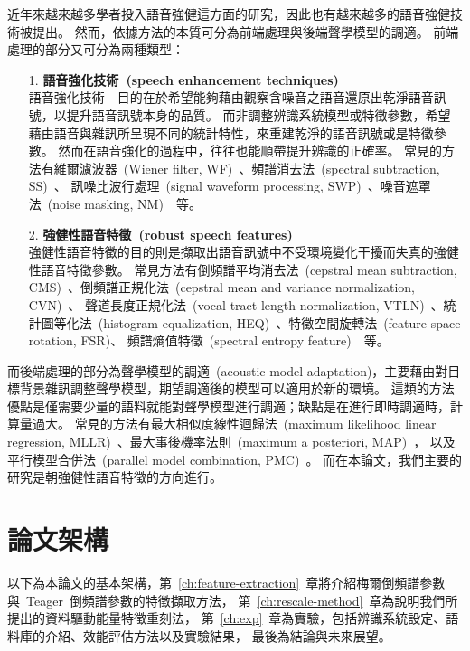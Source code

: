 近年來越來越多學者投入語音強健這方面的研究，因此也有越來越多的語音強健技術被提出。
然而，依據方法的本質可分為前端處理與後端聲學模型的調適。
前端處理的部分又可分為兩種類型：
\begin{itemize}
\item[1.]{\bf 語音強化技術~(speech enhancement techniques)} \\
	語音強化技術~\cite{David2007,Crookes2011}~目的在於希望能夠藉由觀察含噪音之語音還原出乾淨語音訊號，以提升語音訊號本身的品質。
	而非調整辨識系統模型或特徵參數，希望藉由語音與雜訊所呈現不同的統計特性，來重建乾淨的語音訊號或是特徵參數。
	然而在語音強化的過程中，往往也能順帶提升辨識的正確率。
	常見的方法有維爾濾波器~(Wiener filter, WF)~\cite{Ngo2012}、頻譜消去法~(spectral subtraction, SS)~\cite{Randy2004}、
	訊噪比波行處理~(signal waveform processing, SWP)~\cite{Macho2001}、噪音遮罩法~(noise masking, NM)~\cite{Christophe2007}~等。
\item[2.]{\bf 強健性語音特徵~(robust speech features)} \\
	強健性語音特徵的目的則是擷取出語音訊號中不受環境變化干擾而失真的強健性語音特徵參數。
	常見方法有倒頻譜平均消去法~(cepstral mean subtraction, CMS)~\cite{Veisi2011}、倒頻譜正規化法~(cepstral mean and variance normalization, CVN)~\cite{Viikki1988}、
	聲道長度正規化法~(vocal tract length normalization, VTLN)~\cite{Tom1998}、統計圖等化法~(histogram equalization, HEQ)~\cite{Yasunari2003}、特徵空間旋轉法~(feature space rotation, FSR)、
	頻譜熵值特徵~(spectral entropy feature)~\cite{Misra2005}~等。
\end{itemize}
而後端處理的部分為聲學模型的調適~(acoustic model adaptation)，主要藉由對目標背景雜訊調整聲學模型，期望調適後的模型可以適用於新的環境。
這類的方法優點是僅需要少量的語料就能對聲學模型進行調適；缺點是在進行即時調適時，計算量過大。
常見的方法有最大相似度線性迴歸法~(maximum likelihood linear regression, MLLR)~\cite{Raghavan1999}、最大事後機率法則~(maximum a posteriori, MAP)~\cite{Gauvain1994}，
以及平行模型合併法~(parallel model combination, PMC)~\cite{Veisi2009}。
而在本論文，我們主要的研究是朝強健性語音特徵的方向進行。

\section{論文架構}
以下為本論文的基本架構，第~\ref{ch:feature-extraction}~章將介紹梅爾倒頻譜參數與~Teager~倒頻譜參數的特徵擷取方法，
第~\ref{ch:rescale-method}~章為說明我們所提出的資料驅動能量特徵重刻法，
第~\ref{ch:exp}~章為實驗，包括辨識系統設定、語料庫的介紹、效能評估方法以及實驗結果，
最後為結論與未來展望。